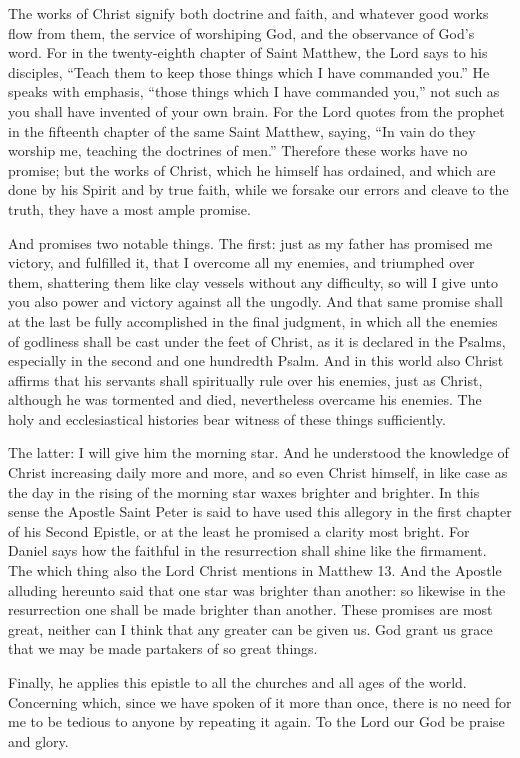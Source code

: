 The works of Christ signify both doctrine and faith, and whatever good works flow from them, the service of worshiping God, and the observance of God’s word. For in the twenty-eighth chapter of Saint Matthew, the Lord says to his disciples, “Teach them to keep those things which I have commanded you.” He speaks with emphasis, “those things which I have commanded you,” not such as you shall have invented of your own brain. For the Lord quotes from the prophet in the fifteenth chapter of the same Saint Matthew, saying, “In vain do they worship me, teaching the doctrines of men.” Therefore these works have no promise; but the works of Christ, which he himself has ordained, and which are done by his Spirit and by true faith, while we forsake our errors and cleave to the truth, they have a most ample promise.

And promises two notable things. The first: just as my father has promised me victory, and fulfilled it, that I overcome all my enemies, and triumphed over them, shattering them like clay vessels without any difficulty, so will I give unto you also power and victory against all the ungodly. And that same promise shall at the last be fully accomplished in the final judgment, in which all the enemies of godliness shall be cast under the feet of Christ, as it is declared in the Psalms, especially in the second and one hundredth Psalm. And in this world also Christ affirms that his servants shall spiritually rule over his enemies, just as Christ, although he was tormented and died, nevertheless overcame his enemies. The holy and ecclesiastical histories bear witness of these things sufficiently.

The latter: I will give him the morning star. And he understood the knowledge of Christ increasing daily more and more, and so even Christ himself, in like case as the day in the rising of the morning star waxes brighter and brighter. In this sense the Apostle Saint Peter is said to have used this allegory in the first chapter of his Second Epistle, or at the least he promised a clarity most bright. For Daniel says how the faithful in the resurrection shall shine like the firmament. The which thing also the Lord Christ mentions in Matthew 13. And the Apostle alluding hereunto said that one star was brighter than another: so likewise in the resurrection one shall be made brighter than another. These promises are most great, neither can I think that any greater can be given us. God grant us grace that we may be made partakers of so great things.

Finally, he applies this epistle to all the churches and all ages of the world. Concerning which, since we have spoken of it more than once, there is no need for me to be tedious to anyone by repeating it again. To the Lord our God be praise and glory.
